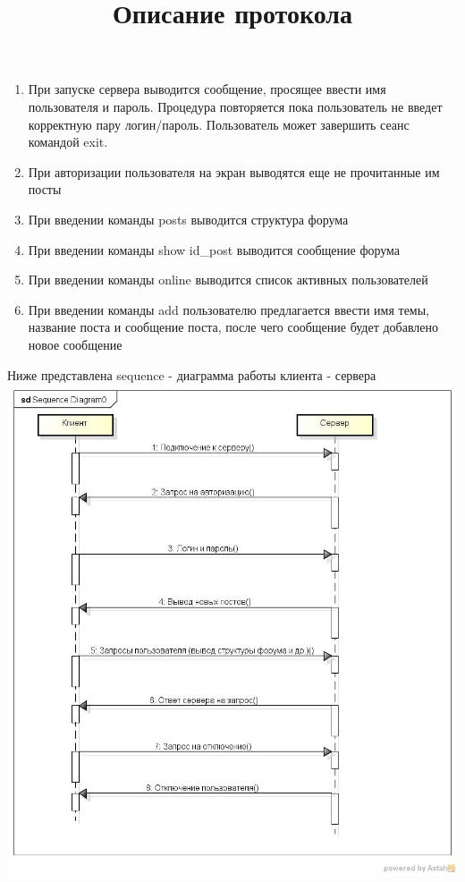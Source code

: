 \documentclass[10pt,a4paper]{report}
\begin{document}
\title{Описание протокола}
\begin{enumerate}
\item При запуске сервера выводится сообщение, просящее ввести имя пользователя и пароль. Процедура повторяется пока пользователь не введет корректную пару логин/пароль. Пользователь может завершить сеанс командой exit.
\item При авторизации пользователя на экран выводятся еще не прочитанные им посты
\item При введении команды posts выводится структура форума
\item При введении команды show id_post выводится сообщение форума
\item При введении команды online выводится список активных пользователей
\item При введении команды add пользователю предлагается ввести имя темы, название поста и сообщение поста, после чего сообщение будет добавлено новое сообщение
\end{enumerate}
Ниже представлена sequence - диаграмма работы клиента - сервера
\includegraphics[scale=0.9]{diagram}
\end{document}
